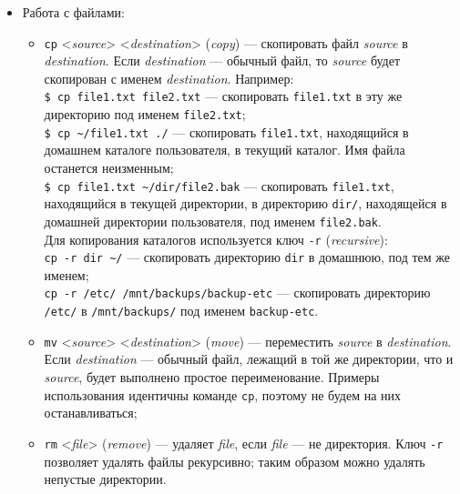 \begin{itemize}
\begin{itemize}
  \end{itemize}
 \item Работа с файлами:
  \begin{itemize}
   \item \texttt{cp} <\emph{source}> <\emph{destination}> (\emph{copy}) --- скопировать файл \emph{source} в \emph{destination}. Если \emph{destination} --- обычный файл, то \emph{source} будет скопирован с именем \emph{destination}. Например:\\
    \texttt{\$ cp file1.txt file2.txt} --- скопировать \texttt{file1.txt} в эту же директорию под именем \texttt{file2.txt};\\
    \texttt{\$ cp \~{}/file1.txt ./} --- скопировать \texttt{file1.txt}, находящийся в домашнем каталоге пользователя, в текущий каталог. Имя файла останется неизменным;\\
    \texttt{\$ cp file1.txt \~{}/dir/file2.bak} --- скопировать \texttt{file1.txt}, находящийся в текущей директории, в директорию \texttt{dir/}, находящейся в домашней директории пользователя, под именем \texttt{file2.bak}.\\
   Для копирования каталогов используется ключ \texttt{-r} (\emph{recursive}):\\
    \texttt{cp -r dir \~{}/} --- скопировать директорию \texttt{dir} в домашнюю, под тем же именем;\\
    \texttt{cp -r /etc/ /mnt/backups/backup-etc} --- скопировать директорию \texttt{/etc/} в \texttt{/mnt/backups/} под именем \texttt{backup-etc}.
   \item \texttt{mv} <\emph{source}> <\emph{destination}> (\emph{move}) --- переместить \emph{source} в \emph{des\-ti\-na\-ti\-on}. Если \emph{destination} --- обычный файл, лежащий в той же директории, что и \emph{source}, будет выполнено простое переименование. Примеры использования идентичны команде \texttt{cp}, поэтому не будем на них останавливаться;
   \item \texttt{rm} <\emph{file}> (\emph{remove}) --- удаляет \emph{file}, если \emph{file} --- не директория. Ключ \texttt{-r} позволяет удалять файлы рекурсивно; таким образом можно удалять непустые директории.
  \end{itemize}
\end{itemize}

